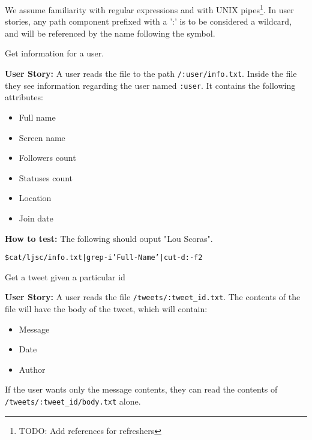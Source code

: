 We assume familiarity with regular expressions and with UNIX
pipes\footnote{TODO: Add references for refreshers}. In user stories, any path
component prefixed with a ':' is to be considered a wildcard, and will be
referenced by the name following the symbol.

\hrulefill

\newenvironment{Requirements}
  {\begin{list}{SR-\arabic{requirements}.}%
               {}}%
  {\end{list}}

\begin{Requirements}

\item Get information for a user.

\textbf{User Story:} A user reads the file to the path \texttt{/:user/info.txt}.
Inside the file they see information regarding the user named \texttt{:user}. It
contains the following attributes:

\begin{itemize}
\item Full name
\item Screen name
\item Followers count
\item Statuses count
\item Location
\item Join date
\end{itemize}

\textbf{How to test:} The following should ouput "Lou Scoras".

\begin{alltt}
    \$ cat /ljsc/info.txt | grep -i 'Full-Name' | cut -d: -f2 
\end{alltt}

\item Get a tweet given a particular id\label{get-a-tweet}

\textbf{User Story:} A user reads the file \texttt{/tweets/:tweet\_id.txt}.
The contents of the file will have the body of the tweet, which will contain:

\begin{itemize}
\item Message
\item Date
\item Author
\end{itemize}

If the user wants only the message contents, they can read the contents of
\texttt{/tweets/:tweet\_id/body.txt} alone.


\end{Requirements}
